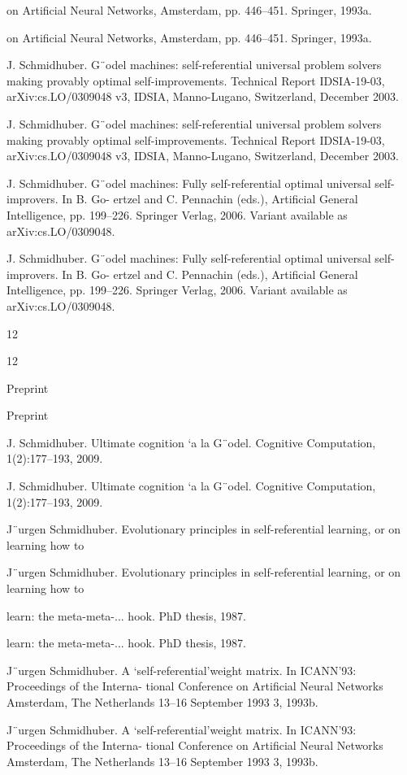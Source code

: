 \documentclass[12pt]{article}
\begin{document}
on Artificial Neural Networks, Amsterdam, pp. 446–451. Springer, 1993a.


on Artificial Neural Networks, Amsterdam, pp. 446–451. Springer, 1993a.


J. Schmidhuber. G¨odel machines: self-referential universal problem solvers making provably
optimal self-improvements. Technical Report IDSIA-19-03, arXiv:cs.LO/0309048 v3, IDSIA,
Manno-Lugano, Switzerland, December 2003.


J. Schmidhuber. G¨odel machines: self-referential universal problem solvers making provably
optimal self-improvements. Technical Report IDSIA-19-03, arXiv:cs.LO/0309048 v3, IDSIA,
Manno-Lugano, Switzerland, December 2003.


J. Schmidhuber. G¨odel machines: Fully self-referential optimal universal self-improvers. In B. Go-
ertzel and C. Pennachin (eds.), Artificial General Intelligence, pp. 199–226. Springer Verlag,
2006. Variant available as arXiv:cs.LO/0309048.


J. Schmidhuber. G¨odel machines: Fully self-referential optimal universal self-improvers. In B. Go-
ertzel and C. Pennachin (eds.), Artificial General Intelligence, pp. 199–226. Springer Verlag,
2006. Variant available as arXiv:cs.LO/0309048.


12


12


Preprint


Preprint


J. Schmidhuber. Ultimate cognition `a la G¨odel. Cognitive Computation, 1(2):177–193, 2009.


J. Schmidhuber. Ultimate cognition `a la G¨odel. Cognitive Computation, 1(2):177–193, 2009.


J¨urgen Schmidhuber. Evolutionary principles in self-referential learning, or on learning how to


J¨urgen Schmidhuber. Evolutionary principles in self-referential learning, or on learning how to


learn: the meta-meta-... hook. PhD thesis, 1987.


learn: the meta-meta-... hook. PhD thesis, 1987.


J¨urgen Schmidhuber. A ‘self-referential’weight matrix. In ICANN’93: Proceedings of the Interna-
tional Conference on Artificial Neural Networks Amsterdam, The Netherlands 13–16 September
1993 3, 1993b.


J¨urgen Schmidhuber. A ‘self-referential’weight matrix. In ICANN’93: Proceedings of the Interna-
tional Conference on Artificial Neural Networks Amsterdam, The Netherlands 13–16 September
1993 3, 1993b.
\end{document}
